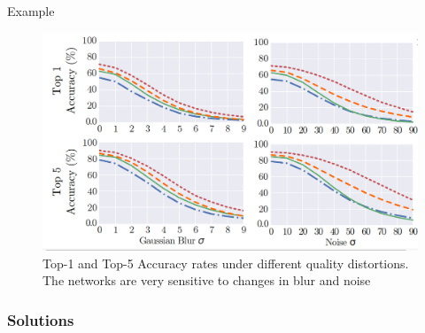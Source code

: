 \documentclass{libs/ufc_format}
\newcommand{\tikzmark}[1]{\tikz[overlay,remember picture] \node (#1) {};}
\begin{document}
\begin{frame}{Example}
    \begin{figure}
        \centering
        \includegraphics[scale=0.2]{libs/acceffect.png}
        \vspace{0.4cm}
        \caption{Top-1 and Top-5 Accuracy rates under different quality distortions. The networks are very sensitive to changes in blur and noise}
        \label{fig:challenge3}
    \end{figure}

\end{frame}


\subsubsection{Solutions}

\end{document}
